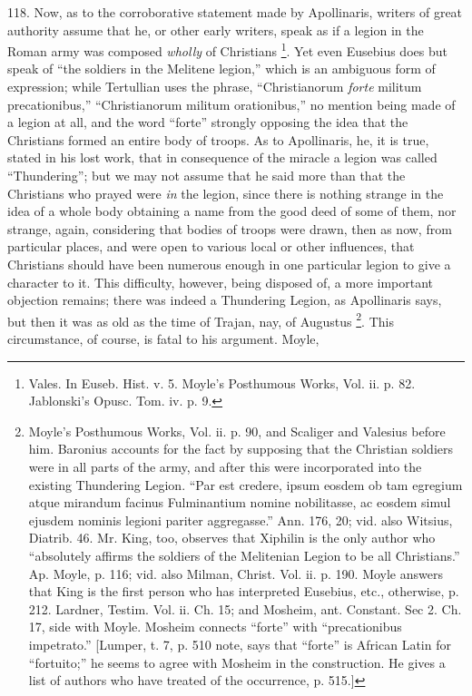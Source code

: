 118.
Now, as to the corroborative statement made by Apollinaris, writers of
great authority assume that he, or other early writers, speak as if a
legion in the Roman army was composed \emph{wholly} of Christians \footnote{Vales. In Euseb. Hist. v. 5. Moyle's Posthumous Works, Vol. ii. p. 82.
Jablonski's Opusc. Tom. iv. p. 9.}. Yet even Eusebius does but speak of ``the soldiers in the
Melitene legion,'' which is an ambiguous form of expression; while
Tertullian uses the phrase, ``Christianorum \emph{forte} militum
precationibus,'' ``Christianorum militum orationibus,'' no mention being
made of a legion at all, and the word ``forte'' strongly opposing
the idea that the Christians formed an entire body of troops. As to
Apollinaris, he, it is true, stated in his lost work, that in
consequence of the miracle a legion was called ``Thundering''; but we
may not assume that he said more than that the Christians who prayed
were \emph{in} the legion, since there is nothing strange in the idea
of a whole body obtaining a name from the good deed of some of them,
nor strange, again, considering that bodies of troops were drawn, then
as now, from particular places, and were open to various local or
other influences, that Christians should have been numerous enough in
one particular legion to give a character to it. This
difficulty, however, being disposed of, a more important objection
remains; there was indeed a Thundering Legion, as Apollinaris says,
but then it was as old as the time of Trajan, nay, of Augustus \footnote{Moyle's Posthumous Works, Vol. ii. p. 90, and Scaliger and Valesius
before him. Baronius accounts for the fact by supposing that the
Christian soldiers were in all parts of the army, and after this were
incorporated into the existing Thundering Legion. ``Par est credere,
ipsum eosdem ob tam egregium atque mirandum facinus Fulminantium
nomine nobilitasse, ac eosdem simul ejusdem nominis legioni pariter
aggregasse.'' Ann. 176, 20; vid. also Witsius, Diatrib. 46. Mr. King,
too, observes that Xiphilin is the only author who ``absolutely affirms
the soldiers of the Melitenian Legion to be all Christians.'' Ap. Moyle,
p. 116; vid. also Milman, Christ. Vol. ii. p. 190. Moyle answers that
King is the first person who has interpreted Eusebius, etc.,
otherwise, p. 212. Lardner, Testim. Vol. ii. Ch. 15; and Mosheim, ant.
Constant. Sec 2. Ch. 17, side with Moyle. Mosheim connects ``forte''
with ``precationibus impetrato.'' [Lumper, t. 7, p. 510 note, says that ``forte''
is African Latin for ``fortuito;'' he seems to agree with Mosheim
in the construction. He gives a list of authors who have treated of
the occurrence, p. 515.]}. This circumstance, of course, is fatal to his argument. Moyle,
